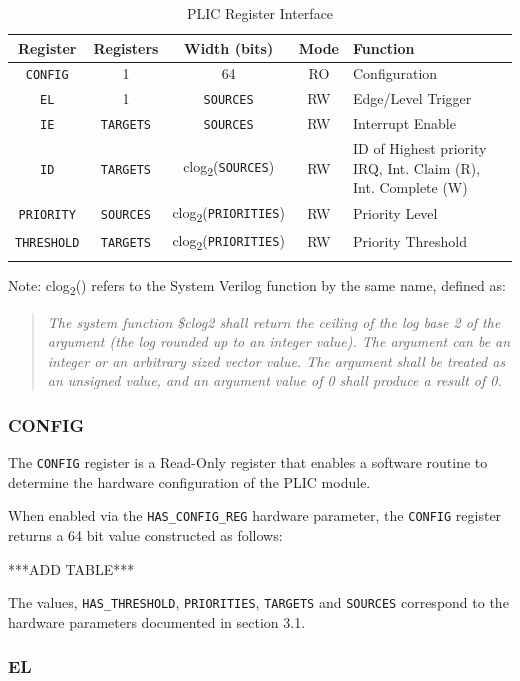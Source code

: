 \begin{longtable}[]{@{}ccccp{3cm}@{}}
\toprule
\textbf{Register} & \textbf{Registers} & \textbf{Width (bits)} & \textbf{Mode} & \textbf{Function}\tabularnewline
\midrule
\endhead
\texttt{CONFIG} & 1 & 64 & RO & Configuration\tabularnewline
\texttt{EL} & 1 & \texttt{SOURCES} & RW & Edge/Level Trigger\tabularnewline
\texttt{IE} & \texttt{TARGETS} & \texttt{SOURCES} & RW & Interrupt Enable\tabularnewline
\texttt{ID} & \texttt{TARGETS} & clog\textsubscript{2}(\texttt{SOURCES}) & RW & ID of Highest priority IRQ, Int. Claim (R), Int. Complete (W)\tabularnewline
\texttt{PRIORITY} & \texttt{SOURCES} & clog\textsubscript{2}(\texttt{PRIORITIES}) & RW & Priority Level\tabularnewline
\texttt{THRESHOLD} & \texttt{TARGETS} & clog\textsubscript{2}(\texttt{PRIORITIES}) & RW & Priority Threshold\tabularnewline
\bottomrule
\caption{PLIC Register Interface}
\label{tab:REGIF}
\end{longtable}

Note: clog\textsubscript{2}() refers to the System Verilog function by
the same name, defined as:

\begin{quote}
\emph{The system function \$clog2 shall return the ceiling of the log
base 2 of the argument (the log rounded up to an integer value). The
argument can be an integer or an arbitrary sized vector value. The
argument shall be treated as an unsigned value, and an argument value of
0 shall produce a result of 0.}
\end{quote}

\subsubsection{CONFIG}

The \texttt{CONFIG} register is a Read-Only register that enables a
software routine to determine the hardware configuration of the PLIC
module.

When enabled via the \texttt{HAS\_CONFIG\_REG} hardware parameter, the
\texttt{CONFIG} register returns a 64 bit value constructed as follows:


***ADD TABLE***

The values, \texttt{HAS\_THRESHOLD}, \texttt{PRIORITIES},
\texttt{TARGETS} and \texttt{SOURCES} correspond to the hardware
parameters documented in section 3.1.

\subsubsection{EL}

